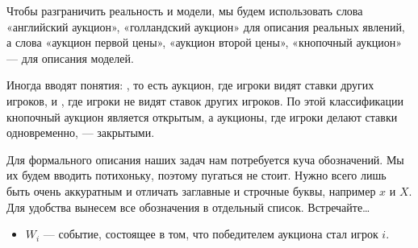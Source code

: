 Чтобы разграничить реальность и модели, мы будем использовать слова «анг\-лий\-ский аукцион», «голландский аукцион» для описания реальных явлений, а слова «аукцион первой цены», «аукцион второй цены», «кнопочный аукцион» — для описания моделей.

Иногда вводят понятия: , то есть аукцион, где игроки видят ставки других игроков, и , где игроки не видят ставок других игроков. По этой классификации кнопочный аукцион является открытым, а аук\-цио\-ны, где игроки делают ставки одновременно, — закрытыми.

Для формального описания наших задач нам потребуется куча обозначений. Мы их будем вводить потихоньку, поэтому пугаться не стоит. Нужно всего лишь быть очень аккуратным и отличать заглавные и строчные буквы, например $x$ и $X$.
Для удобства вынесем все обозначения в отдельный список. Встречайте\ldots

\newpage

\begin{center}
\end{center}

\begin{itemize}
\item $W_{i}$ — событие, состоящее в том, что победителем аукциона стал игрок $ i $.
\end{itemize}


